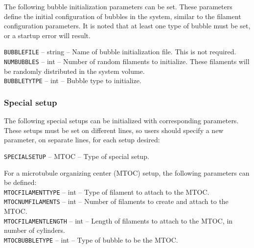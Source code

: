 \documentclass[11pt, oneside]{article}   	%
\begin{document}
The following bubble initialization parameters can be set. These parameters define the initial configuration of bubbles in the system, similar to the filament configuration parameters. It is noted that at least one type of bubble must be set, or a startup error will result.\\

\small

  \noindent\texttt{BUBBLEFILE} -- string -- Name of bubble initialization file. This is not required.\\

  \noindent\texttt{NUMBUBBLES} -- int -- Number of random filaments to initialize. These filaments will be randomly 
  distributed in the system volume.\\

   \noindent\texttt{BUBBLETYTPE} -- int -- Bubble type to initialize.\\
   
\normalsize

\subsubsection{Special setup}

The following special setups can be initialized with corresponding parameters. These setups must be set on different lines, so users should specify a new parameter, on separate lines, for each setup desired:\\

\small 

\noindent\texttt{SPECIALSETUP} -- MTOC -- Type of special setup. \\

\normalsize

\noindent For a microtubule organizing center (MTOC) setup, the following parameters can be defined:\\

\small
  \noindent\texttt{MTOCFILAMENTTYPE} -- int -- Type of filament to attach to the MTOC.\\

  \noindent\texttt{MTOCNUMFILAMENTS} -- int -- Number of filaments to create and attach to the MTOC.\\
  
  \noindent\texttt{MTOCFILAMENTLENGTH} -- int -- Length of filaments to attach to the MTOC, in number of cylinders.\\
    
  \noindent\texttt{MTOCBUBBLETYPE} -- int -- Type of bubble to be the MTOC. \\
\normalsize
\end{document}
